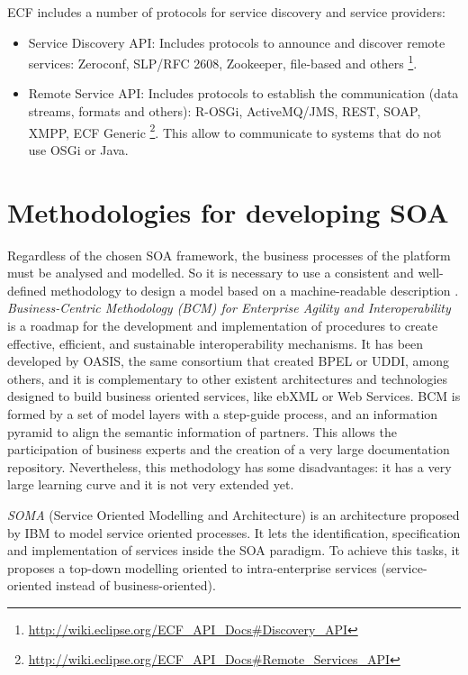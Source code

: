 ECF includes a number of protocols for service discovery and service providers:
\begin{itemize}
\item Service Discovery API: Includes protocols to announce and discover remote services: Zeroconf, SLP/RFC 2608, Zookeeper, file-based and others \footnote{\url{http://wiki.eclipse.org/ECF_API_Docs\#Discovery_API}}.
\item Remote Service API: Includes protocols to establish the communication (data streams, formats and others): R-OSGi, ActiveMQ/JMS, REST, SOAP, XMPP, ECF Generic \footnote{\url{http://wiki.eclipse.org/ECF_API_Docs\#Remote_Services_API}}. This allow to communicate to systems that do not use OSGi or Java.
\end{itemize}

\section{Methodologies for developing SOA}
Regardless of the chosen SOA framework, the business processes of the platform must be analysed and modelled. So it is necessary to use a consistent and well-defined methodology to design a model based on a machine-readable description \cite{Garcia09UMM}. {\em Business-Centric Methodology (BCM) for Enterprise Agility and Interoperability} \cite{Oasis03BCM} is a roadmap for the development and implementation of procedures to create effective, efficient, and sustainable interoperability mechanisms. It has been developed by OASIS, the same consortium that created BPEL or UDDI, among others, and it is complementary to other existent architectures and technologies designed to build business oriented services, like ebXML or Web Services. BCM is formed by a set of model layers with a step-guide process, and an information pyramid to align the semantic information of partners. This allows the participation of business experts and the creation of a very large documentation repository. Nevertheless, this methodology has some disadvantages: it has a very large learning curve and it is not very extended yet. 

{\em SOMA} (Service Oriented Modelling and Architecture) \cite{Arsanjani2008SOMA} is an architecture proposed by IBM to model service oriented processes. It lets the identification, specification and implementation of services inside the SOA paradigm. To achieve this tasks, it proposes a top-down modelling oriented to intra-enterprise services (service-oriented instead of business-oriented).

